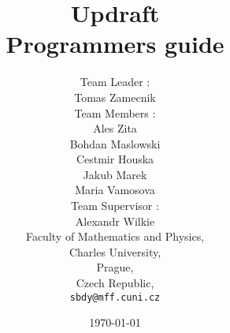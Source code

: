\documentclass[12pt,a4paper]{refart}
\begin{document}

\title{Updraft \\ Programmers guide}
 \author{Team Leader : \\
	Tomas Zamecnik \\
	Team Members : \\
	Ales Zita \\
	Bohdan Maslowski \\
	Cestmir Houska \\
	Jakub Marek \\
	Maria Vamosova \\
	Team Supervisor :\\
	Alexandr Wilkie\\
   Faculty of Mathematics and Physics,\\
   Charles University,\\
   Prague,\\
   Czech Republic,\\
   \texttt{sbdy@mff.cuni.cz}}
 \date{\today}

\maketitle



\clearpage
 
\pagestyle{headings}


\setcounter{secnumdepth}{1}
\setcounter{tocdepth}{2}
\tableofcontents



\end{document}
